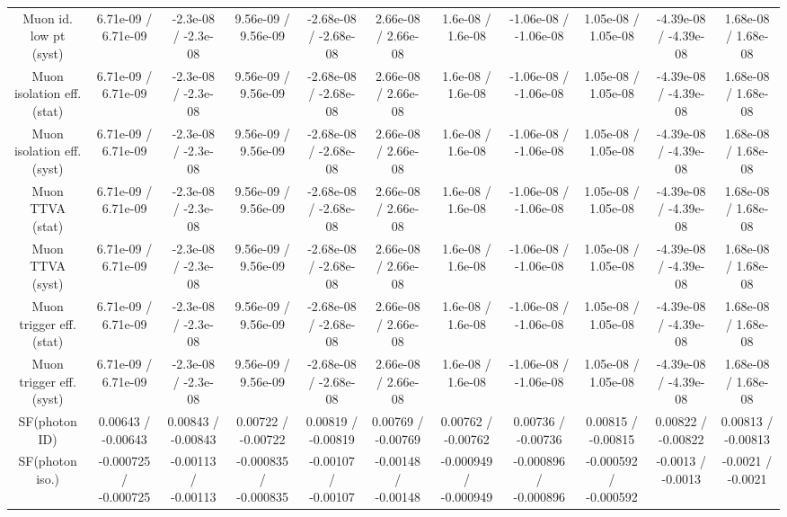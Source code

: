 \begin{table}[htbp]
\begin{center}
\begin{tabular}{|c|c|c|c|c|c|c|c|c|c|c|}
  Muon id. low pt (syst) & 6.71e-09 / 6.71e-09 & -2.3e-08 / -2.3e-08 & 9.56e-09 / 9.56e-09 & -2.68e-08 / -2.68e-08 & 2.66e-08 / 2.66e-08 & 1.6e-08 / 1.6e-08 & -1.06e-08 / -1.06e-08 & 1.05e-08 / 1.05e-08 & -4.39e-08 / -4.39e-08 & 1.68e-08 / 1.68e-08 \\ 
  Muon isolation eff. (stat) & 6.71e-09 / 6.71e-09 & -2.3e-08 / -2.3e-08 & 9.56e-09 / 9.56e-09 & -2.68e-08 / -2.68e-08 & 2.66e-08 / 2.66e-08 & 1.6e-08 / 1.6e-08 & -1.06e-08 / -1.06e-08 & 1.05e-08 / 1.05e-08 & -4.39e-08 / -4.39e-08 & 1.68e-08 / 1.68e-08 \\ 
  Muon isolation eff. (syst) & 6.71e-09 / 6.71e-09 & -2.3e-08 / -2.3e-08 & 9.56e-09 / 9.56e-09 & -2.68e-08 / -2.68e-08 & 2.66e-08 / 2.66e-08 & 1.6e-08 / 1.6e-08 & -1.06e-08 / -1.06e-08 & 1.05e-08 / 1.05e-08 & -4.39e-08 / -4.39e-08 & 1.68e-08 / 1.68e-08 \\ 
  Muon TTVA (stat) & 6.71e-09 / 6.71e-09 & -2.3e-08 / -2.3e-08 & 9.56e-09 / 9.56e-09 & -2.68e-08 / -2.68e-08 & 2.66e-08 / 2.66e-08 & 1.6e-08 / 1.6e-08 & -1.06e-08 / -1.06e-08 & 1.05e-08 / 1.05e-08 & -4.39e-08 / -4.39e-08 & 1.68e-08 / 1.68e-08 \\ 
  Muon TTVA (syst) & 6.71e-09 / 6.71e-09 & -2.3e-08 / -2.3e-08 & 9.56e-09 / 9.56e-09 & -2.68e-08 / -2.68e-08 & 2.66e-08 / 2.66e-08 & 1.6e-08 / 1.6e-08 & -1.06e-08 / -1.06e-08 & 1.05e-08 / 1.05e-08 & -4.39e-08 / -4.39e-08 & 1.68e-08 / 1.68e-08 \\ 
  Muon trigger eff. (stat) & 6.71e-09 / 6.71e-09 & -2.3e-08 / -2.3e-08 & 9.56e-09 / 9.56e-09 & -2.68e-08 / -2.68e-08 & 2.66e-08 / 2.66e-08 & 1.6e-08 / 1.6e-08 & -1.06e-08 / -1.06e-08 & 1.05e-08 / 1.05e-08 & -4.39e-08 / -4.39e-08 & 1.68e-08 / 1.68e-08 \\ 
  Muon trigger eff. (syst) & 6.71e-09 / 6.71e-09 & -2.3e-08 / -2.3e-08 & 9.56e-09 / 9.56e-09 & -2.68e-08 / -2.68e-08 & 2.66e-08 / 2.66e-08 & 1.6e-08 / 1.6e-08 & -1.06e-08 / -1.06e-08 & 1.05e-08 / 1.05e-08 & -4.39e-08 / -4.39e-08 & 1.68e-08 / 1.68e-08 \\ 
  SF(photon ID) & 0.00643 / -0.00643 & 0.00843 / -0.00843 & 0.00722 / -0.00722 & 0.00819 / -0.00819 & 0.00769 / -0.00769 & 0.00762 / -0.00762 & 0.00736 / -0.00736 & 0.00815 / -0.00815 & 0.00822 / -0.00822 & 0.00813 / -0.00813 \\ 
  SF(photon iso.) & -0.000725 / -0.000725 & -0.00113 / -0.00113 & -0.000835 / -0.000835 & -0.00107 / -0.00107 & -0.00148 / -0.00148 & -0.000949 / -0.000949 & -0.000896 / -0.000896 & -0.000592 / -0.000592 & -0.0013 / -0.0013 & -0.0021 / -0.0021 \\ 

\end{tabular}
\end{center}
\end{table}

